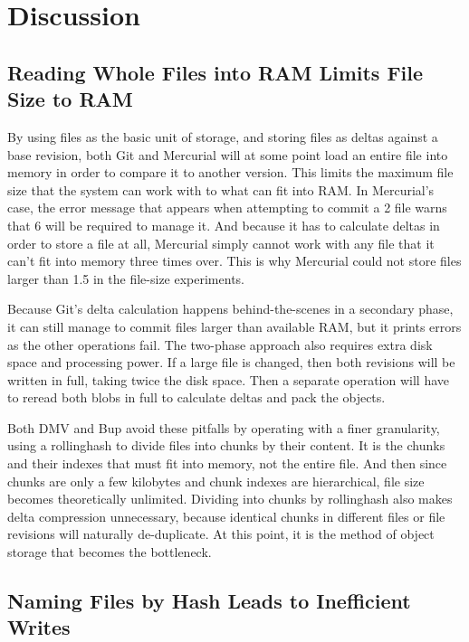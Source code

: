 \section{Discussion}

\subsection{Reading Whole Files into RAM Limits File Size to RAM}

By using files as the basic unit of storage, and storing files as deltas against
a base revision, both Git and Mercurial will at some point load an entire file
into memory in order to compare it to another version. This limits the maximum
file size that the system can work with to what can fit into RAM. In Mercurial's
case, the error message that appears when attempting to \gls{commit} a
\SI{2}{\gib} file warns that \SI{6}{\gib} will be required to manage it. And
because it has to calculate deltas in order to store a file at all, Mercurial
simply cannot work with any file that it can't fit into memory three times over.
This is why Mercurial could not store files larger than \SI{1.5}{\gib} in the
file-size experiments.

Because Git's delta calculation happens behind-the-scenes in a secondary phase,
it can still manage to \gls{commit} files larger than available RAM, but it
prints errors as the other operations fail. The two-phase approach also requires
extra disk space and processing power. If a large file is changed, then both
revisions will be written in full, taking twice the disk space. Then a separate
operation will have to reread both \glspl{blob} in full to calculate deltas and
pack the objects.

Both \gls{DMV} and Bup avoid these pitfalls by operating with a finer
granularity, using a \gls{rollinghash} to divide files into chunks by their
content. It is the chunks and their indexes that must fit into memory, not the
entire file. And then since chunks are only a few kilobytes and chunk indexes
are hierarchical, file size becomes theoretically unlimited. Dividing into
chunks by \gls{rollinghash} also makes delta compression unnecessary, because
identical chunks in different files or file revisions will naturally
de-duplicate. At this point, it is the method of object storage that becomes the
bottleneck.

\subsection{Naming Files by Hash Leads to Inefficient Writes}

